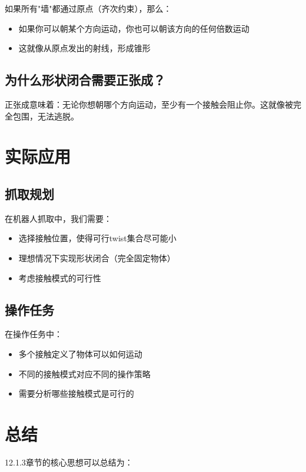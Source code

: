 \documentclass[12pt,a4paper]{article}
\begin{document}
如果所有"墙"都通过原点（齐次约束），那么：
\begin{itemize}
\item 如果你可以朝某个方向运动，你也可以朝该方向的任何倍数运动
\item 这就像从原点发出的射线，形成锥形
\end{itemize}

\subsection{为什么形状闭合需要正张成？}

正张成意味着：无论你想朝哪个方向运动，至少有一个接触会阻止你。这就像被完全包围，无法逃脱。

\section{实际应用}

\subsection{抓取规划}

在机器人抓取中，我们需要：
\begin{itemize}
\item 选择接触位置，使得可行twist集合尽可能小
\item 理想情况下实现形状闭合（完全固定物体）
\item 考虑接触模式的可行性
\end{itemize}

\subsection{操作任务}

在操作任务中：
\begin{itemize}
\item 多个接触定义了物体可以如何运动
\item 不同的接触模式对应不同的操作策略
\item 需要分析哪些接触模式是可行的
\end{itemize}

\section{总结}

12.1.3章节的核心思想可以总结为：
\end{document}
